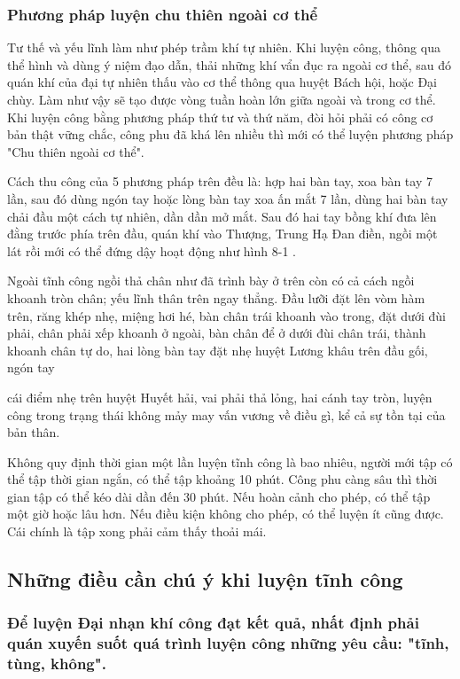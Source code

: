\subsubsection{Phương pháp luyện chu thiên ngoài cơ thể}

Tư thế và yếu lĩnh làm như phép trầm khí tự nhiên. Khi luyện công, thông qua thể hình và dùng ý niệm đạo dẫn, thải những khí vẩn đục ra ngoài cơ thể, sau đó quán khí của đại tự nhiên thấu vào cơ thể thông qua huyệt Bách hội, hoặc Đại chùy. Làm như vậy sẽ tạo được vòng tuần hoàn lớn giữa ngoài và trong cơ thể. Khi luyện công bằng phương pháp thứ tư và thứ năm, đòi hỏi phải có công cơ bản thật vững chắc, công phu đã khá lên nhiều thì mới có thể luyện phương pháp "Chu thiên ngoài cơ thể".

Cách thu công của 5 phương pháp trên đều là: hợp hai bàn tay, xoa bàn tay 7 lần, sau đó dùng ngón tay hoặc lòng bàn tay xoa ấn mắt 7 lần, dùng hai bàn tay chải đầu một cách tự nhiên, dần dần mở mắt. Sau đó hai tay bồng khí đưa lên đằng trước phía trên đầu, quán khí vào Thượng, Trung Hạ Đan điền, ngồi một lát rồi mới có thể đứng dậy hoạt động như hình 8-1 .

Ngoài tĩnh công ngồi thả chân như đã trình bày ở trên còn có cả cách ngồi khoanh tròn chân; yếu lĩnh thân trên ngay thẳng. Đầu lưỡi đặt lên vòm hàm trên, răng khép nhẹ, miệng hơi hé, bàn chân trái khoanh vào trong, đặt dưới đùi phải, chân phải xếp khoanh ở ngoài, bàn chân để ở dưới đùi chân trái, thành khoanh chân tự do, hai lòng bàn tay đặt nhẹ huyệt Lương khâu trên đầu gối, ngón tay

cái điểm nhẹ trên huyệt Huyết hải, vai phải thả lỏng, hai cánh tay tròn, luyện công trong trạng thái không mảy may vấn vương về điều gì, kể cả sự tồn tại của bản thân.

Không quy định thời gian một lần luyện tĩnh công là bao nhiêu, người mới tập có thể tập thời gian ngắn, có thể tập khoảng 10 phút. Công phu càng sâu thì thời gian tập có thể kéo dài dần đến 30 phút. Nếu hoàn cảnh cho phép, có thể tập một giờ hoặc lâu hơn. Nếu điều kiện không cho phép, có thể luyện ít cũng được. Cái chính là tập xong phải cảm thấy thoải mái.

\subsection{Những điều cần chú ý khi luyện tĩnh công}

\subsubsection{Để luyện Đại nhạn khí công đạt kết quả, nhất định phải quán xuyến suốt quá trình luyện công những yêu cầu: "tĩnh, tùng, không".}

